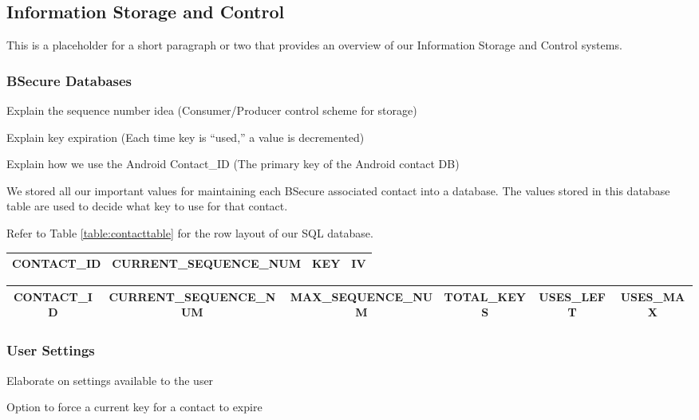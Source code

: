 \subsection{Information Storage and Control}
This is a placeholder for a short paragraph or two that provides an overview of our Information Storage and Control systems.

\subsubsection{BSecure Databases}


Explain the sequence number idea (Consumer/Producer control scheme for storage)

Explain key expiration (Each time key is ``used,'' a value is decremented)

Explain how we use the Android Contact\_ID (The primary key of the Android contact DB)

We stored all our important values for maintaining each BSecure associated contact
into a database. The values stored in this database table are used to decide what key to use for that
contact.

Refer to Table \ref{table:contacttable} for the row layout of our SQL database.

\begin{table*}
\centering
\caption{Key Table Design}
\label{table:contacttable}
\begin{tabular}{|c|c|c|c|} \hline
CONTACT\_ID&CURRENT\_SEQUENCE\_NUM&KEY&IV\\ \hline\end{tabular}
\end{table*}

\begin{table*}
\centering
\caption{Contact Table Design}
\label{table:contacttable}
\begin{tabular}{|c|c|c|c|c|c|} \hline
CONTACT\_ID&CURRENT\_SEQUENCE\_NUM&MAX\_SEQUENCE\_NUM&TOTAL\_KEYS&USES\_LEFT&USES\_MAX\\ \hline\end{tabular}
\end{table*}


\subsubsection{User Settings}
Elaborate on settings available to the user

Option to force a current key for a contact to expire

